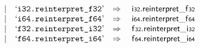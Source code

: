 $$\begin{array}[t]{@{}lrrl@{}l@{}l@{}l@{}}
& & | & \mbox{‘\texttt{i32.reinterpret\_f32}’} & \quad\Rightarrow\quad{} & \mathsf{i{\scriptstyle 32}} {.} {\mathsf{reinterpret}}{\mathsf{\_}}{\mathsf{f{\scriptstyle 32}}} \\
& & | & \mbox{‘\texttt{i64.reinterpret\_f64}’} & \quad\Rightarrow\quad{} & \mathsf{i{\scriptstyle 64}} {.} {\mathsf{reinterpret}}{\mathsf{\_}}{\mathsf{f{\scriptstyle 64}}} \\
& & | & \mbox{‘\texttt{f32.reinterpret\_i32}’} & \quad\Rightarrow\quad{} & \mathsf{f{\scriptstyle 32}} {.} {\mathsf{reinterpret}}{\mathsf{\_}}{\mathsf{i{\scriptstyle 32}}} \\
& & | & \mbox{‘\texttt{f64.reinterpret\_i64}’} & \quad\Rightarrow\quad{} & \mathsf{f{\scriptstyle 64}} {.} {\mathsf{reinterpret}}{\mathsf{\_}}{\mathsf{i{\scriptstyle 64}}} \\
\end{array}
$$

\vspace{1ex}

